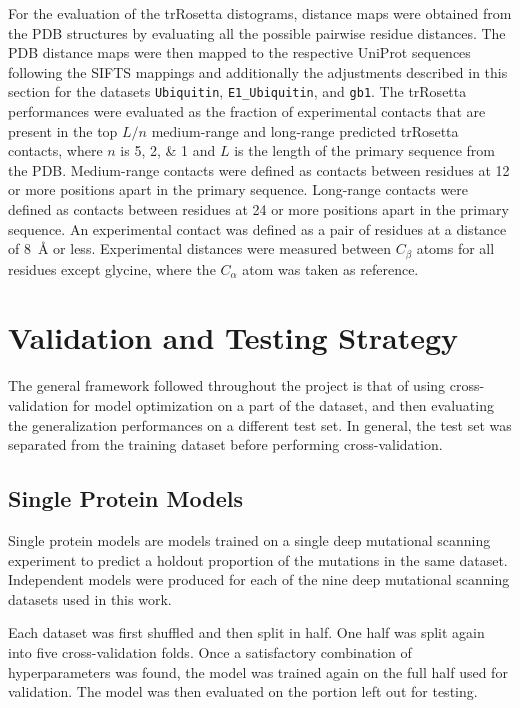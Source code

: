 For the evaluation of the trRosetta distograms, distance maps were obtained from the PDB structures by evaluating all the possible pairwise residue distances.
The PDB distance maps were then mapped to the respective UniProt sequences following the SIFTS mappings and additionally the adjustments described in this section for the datasets \texttt{Ubiquitin}, \texttt{E1\_Ubiquitin}, and \texttt{gb1}.
The trRosetta performances were evaluated as the fraction of experimental contacts that are present in the top $L/n$ medium-range and long-range predicted trRosetta contacts, where $n$ is \numlist{5;2;1} and $L$ is the length of the primary sequence from the PDB\@.
Medium-range contacts were defined as contacts between residues at \num{12} or more positions apart in the primary sequence.
Long-range contacts were defined as contacts between residues at \num{24} or more positions apart in the primary sequence.
An experimental contact was defined as a pair of residues at a distance of \SI{8}{\angstrom} or less.
Experimental distances were measured between $C_\beta$ atoms for all residues except glycine, where the $C_\alpha$ atom was taken as reference.

\section{Validation and Testing Strategy}\label{sec:mm_validation_and_testing}
The general framework followed throughout the project is that of using cross-validation for model optimization on a part of the dataset, and then evaluating the generalization performances on a different test set.
In general, the test set was separated from the training dataset before performing cross-validation.

\subsection{Single Protein Models}\label{sec:mm_single_protein_models}
Single protein models are models trained on a single deep mutational scanning experiment to predict a holdout proportion of the mutations in the same dataset.
Independent models were produced for each of the nine deep mutational scanning datasets used in this work.

Each dataset was first shuffled and then split in half.
One half was split again into five cross-validation folds.
Once a satisfactory combination of hyperparameters was found, the model was trained again on the full half used for validation.
The model was then evaluated on the portion left out for testing.

